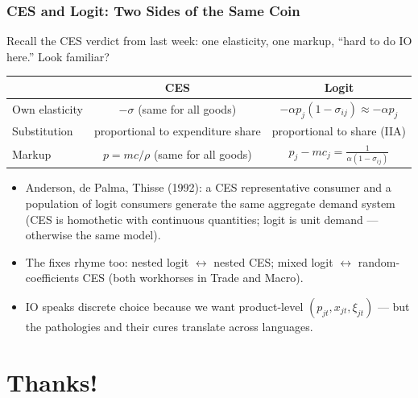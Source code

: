 \documentclass[aspectratio=169,11pt]{beamer}
\begin{document}
\begin{frame}
\frametitle{CES and Logit: Two Sides of the Same Coin}
Recall the CES verdict from last week: one elasticity, one markup, ``hard to do IO here.'' Look familiar?
\begin{center}
\small
\begin{tabular}{lcc}
& CES & Logit \\
\midrule
Own elasticity & $-\sigma$ (same for all goods) & $-\alpha p_j (1-\sigma_{ij}) \approx -\alpha p_j$ \\
Substitution & proportional to expenditure share & proportional to share (IIA) \\
Markup & $p = mc/\rho$ (same for all goods) & $p_j - mc_j = \frac{1}{\alpha(1-\sigma_{ij})}$ \\
\end{tabular}
\end{center}
\begin{itemize}
\item Anderson, de Palma, Thisse (1992): a CES representative consumer and a population of logit consumers generate the \alert{same} aggregate demand system (CES is homothetic with continuous quantities; logit is unit demand --- otherwise the same model).
\item The fixes rhyme too: nested logit $\leftrightarrow$ nested CES; mixed logit $\leftrightarrow$ random-coefficients CES (both workhorses in Trade and Macro).
\item IO speaks discrete choice because we want product-level $(p_{jt}, x_{jt}, \xi_{jt})$ --- but the pathologies and their cures translate across languages.
\end{itemize}
\end{frame}


\section{Thanks!}
\end{document}
